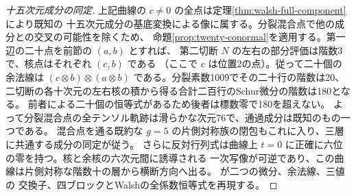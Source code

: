 \begin{proof}[十五次元成分の同定]
上記曲線の $c\ne0$ の全点は定理\ref{thm:walsh-full-component}により既知の
十五次元成分の基底変換による像に属する。分裂混合点で他の成分との交叉の可能性を除くため、
命題\ref{prop:twenty-conormal}を適用する。第一辺の二十点を前節の $(a,b)$ とすれば、
第二切断 $N$ の左右の部分評価は階数3で、核点はそれぞれ $(c,b)$ である
（ここで $c$ は位置2の点）。従って二十個の余法線は
$(c\otimes b)\otimes(a\otimes b)$ である。分裂素数1009でその二十行の階数は20、
二切断の各十次元の左右核の積から得る合計二百行のSchur微分の階数は180となる。
前者による二十個の恒等式があるため後者は標数零で180を超えない。
よって分裂混合点の全テンソル軌跡は滑らかな次元76で、通過成分は既知のもの一つである。
混合点を通る既約な $g=5$ の片側対称族の閉包もこれに入り、三層に共通する成分の同定が従う。
さらに反対行列式は曲線上 $t=0$ に正確に六位の零を持つ。核と余核の六次元間に誘導される
一次写像が可逆であり、この曲線は片側対称な階数十の層から横断方向へ出る。
が二つの微分、余法線、三値の
交換子、四ブロックとWalshの全係数恒等式を再現する。
\end{proof}
